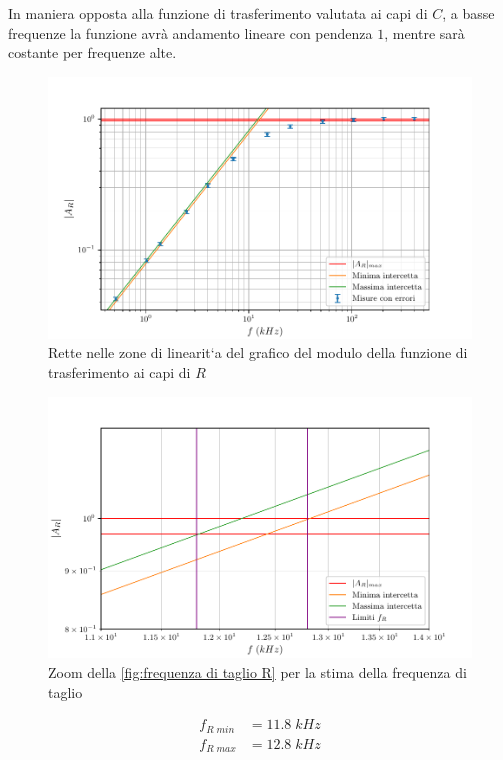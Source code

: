 \documentclass[11pt, a4paper]{article}
\numberwithin{equation}{section} %
\begin{document}
In maniera opposta alla funzione di trasferimento valutata ai capi di $C$, a basse frequenze la funzione avrà andamento lineare con pendenza $1$, mentre sarà costante per frequenze alte.

\begin{figure}[ht!]
    \includegraphics{onda_sin_AR(f)_taglio.pdf}
    \caption{Rette nelle zone di linearit`a del grafico del modulo della funzione di trasferimento ai capi di $R$}
    \label{fig:frequenza di taglio R}
\end{figure}

\newpage

\begin{figure}[ht!]
    \includegraphics{onda_sin_AR(f)_taglio_frequenza.pdf}
    \caption{Zoom della \autoref{fig:frequenza di taglio R} per la stima della frequenza di taglio}
    \label{fig:frequenza di taglio R zoom}
\end{figure}

\begin{align*}
    f_{R \; min} &= 11.8 \; kHz \\
    f_{R \; max} &= 12.8 \; kHz
\end{align*}
\end{document}
